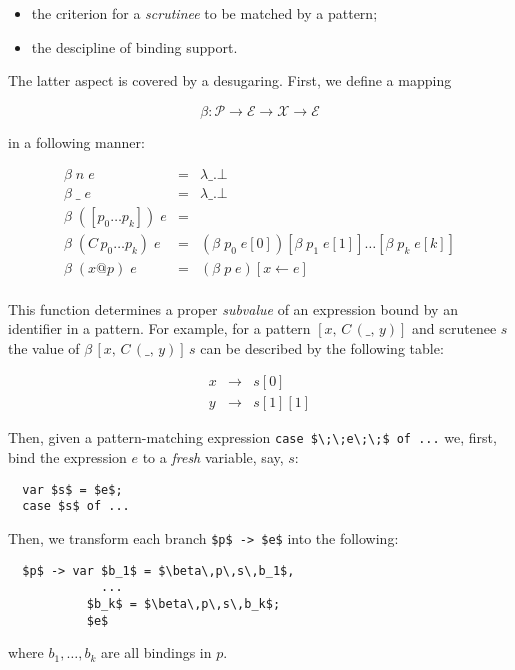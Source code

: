 \documentclass{article}
\newcommand{\llang}[1]{\mbox{\lstinline[mathescape]|#1|}}
\theoremstyle{definition}
\begin{document}
\begin{itemize}
\item the criterion for a \emph{scrutinee} to be matched by a pattern;
\item the descipline of binding support.
\end{itemize}

The latter aspect is covered by a desugaring. First, we define a mapping

\[
\beta : \mathscr P \to \mathscr E \to \mathscr X \to \mathscr E
\]

in a following manner:

\[
\begin{array}{rcl}
  \beta\;n\;e & = & \lambda \_ . \bot \\
  \beta\;\_\;e & = & \lambda \_ . \bot \\
  \beta\;([p_0\dots p_k])\;e & = & \\
  \beta\;(C\,p_0\dots p_k)\;e & = & (\beta\;p_0\;e[0])[\beta\;p_1\;e[1]]\dots [\beta\;p_k\;e[k]]\\
  \beta\;(x@p)\;e & = & (\beta\;p\;e) [x \gets e]\\
\end{array}
\]

This function determines a proper \emph{subvalue} of an expression bound by an identifier in a pattern. For example,
for a pattern $[x,\, C\, (\_,\, y)]$ and scrutenee $s$ the value of $\beta\, [x,\, C\, (\_,\, y)]\,s$ can be described by
the following table:

\[
\begin{array}{rcl}
  x & \to & s[0]\\
  y & \to & s[1][1]
\end{array}
\]

Then, given a pattern-matching expression \llang{case $\;\;e\;\;$ of ...} we, first, bind the expression $e$ to a \emph{fresh} variable,
say, $s$:

\begin{lstlisting}
  var $s$ = $e$;
  case $s$ of ...
\end{lstlisting}

Then, we transform each branch \llang{$p$ -> $e$} into the following:

\begin{lstlisting}
  $p$ -> var $b_1$ = $\beta\,p\,s\,b_1$,
             ...
           $b_k$ = $\beta\,p\,s\,b_k$;
           $e$
\end{lstlisting}

where $b_1,\dots,b_k$ are all bindings in $p$.
\end{document}
